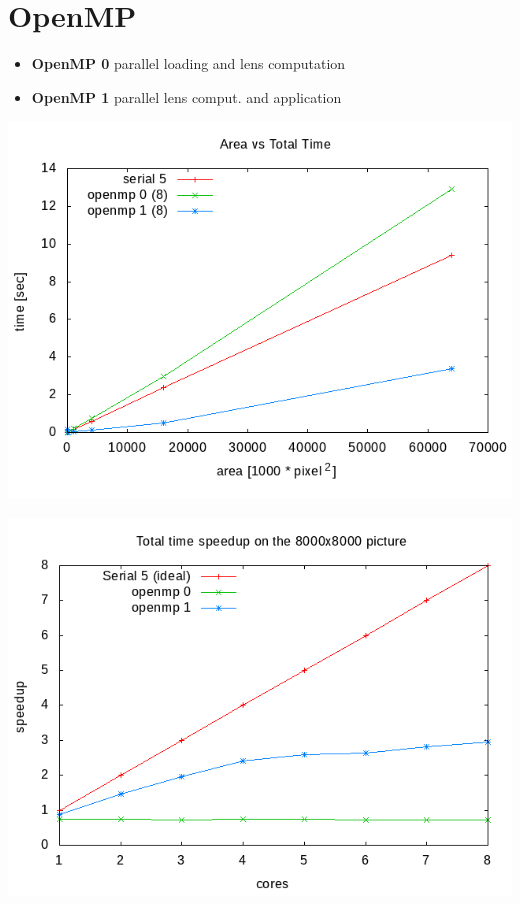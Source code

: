 \documentclass[12pt]{article}
\begin{document}
\section{OpenMP}

\begin{itemize}
    \item \textbf{OpenMP 0} parallel loading and lens computation
    \item \textbf{OpenMP 1} parallel lens comput. and application
\end{itemize}

\begin{center}
    \begin{minipage}[b]{0.45\linewidth}
        \includegraphics[width=\textwidth]{../../plots/areatime_total_linear_omp.png}
    \end{minipage}
    \begin{minipage}[b]{0.45\linewidth}
        \includegraphics[width=\textwidth]{../../plots/omp_speedup_total_8000.png}
    \end{minipage}
\end{center}
\end{document}
